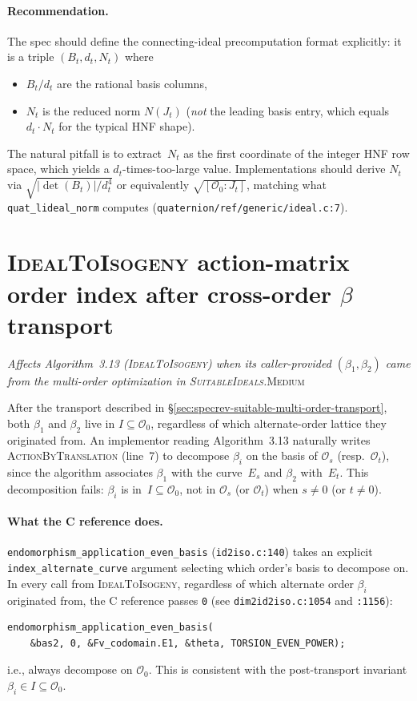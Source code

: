 \documentclass[a4paper,11pt]{article}
\newcommand{\algo}[1]{Algorithm~#1}
\newcommand{\medium}{\textsc{\color{RoyalBlue}Medium}}
\newcommand{\finding}[2]{\noindent\textit{#1}\hfill#2\par\smallskip}
\begin{document}
\paragraph{Recommendation.}
The spec should define the connecting-ideal precomputation
format explicitly: it is a triple $(B_t, d_t, N_t)$ where
\begin{itemize}
  \item $B_t / d_t$ are the rational basis columns,
  \item $N_t$ is the reduced norm $N(J_t)$ (\emph{not} the
    leading basis entry, which equals $d_t \cdot N_t$ for the
    typical HNF shape).
\end{itemize}
The natural pitfall is to extract~$N_t$ as the first
coordinate of the integer HNF row space, which yields a
$d_t$-times-too-large value.  Implementations should derive
$N_t$ via $\sqrt{|\det(B_t)| / d_t^4}$ or equivalently
$\sqrt{[\mathcal{O}_0 : J_t]}$, matching what
\texttt{quat\_lideal\_norm} computes
(\texttt{quaternion/ref/generic/ideal.c:7}).

\section{\textsc{IdealToIsogeny} action-matrix order index after
  cross-order $\beta$ transport}
\label{sec:specrev-action-matrix-index}

\finding{Affects \algo{3.13} (\textsc{IdealToIsogeny}) when its
  caller-provided $(\beta_1, \beta_2)$ came from the multi-order
  optimization in \textsc{SuitableIdeals}.}{\medium}

After the transport described in
\S\ref{sec:specrev-suitable-multi-order-transport}, both $\beta_1$
and $\beta_2$ live in $I \subseteq \mathcal{O}_0$, regardless of
which alternate-order lattice they originated from.  An
implementor reading \algo{3.13} naturally writes
\textsc{ActionByTranslation} (line~7) to decompose $\beta_i$ on
the basis of $\mathcal{O}_{s}$ (resp.\ $\mathcal{O}_{t}$), since
the algorithm associates $\beta_1$ with the curve~$E_s$ and
$\beta_2$ with~$E_t$.  This decomposition fails: $\beta_i$ is
in~$I \subseteq \mathcal{O}_0$, not in $\mathcal{O}_s$
(or $\mathcal{O}_t$) when $s \neq 0$ (or $t \neq 0$).

\paragraph{What the C reference does.}
\texttt{endomorphism\_application\_even\_basis}
(\texttt{id2iso.c:140}) takes an explicit
\texttt{index\_alternate\_curve} argument selecting which
order's basis to decompose on.  In every call from
\textsc{IdealToIsogeny}, regardless of which alternate order
$\beta_i$ originated from, the C reference passes \texttt{0}
(see \texttt{dim2id2iso.c:1054} and \texttt{:1156}):
\begin{verbatim}
endomorphism_application_even_basis(
    &bas2, 0, &Fv_codomain.E1, &theta, TORSION_EVEN_POWER);
\end{verbatim}
i.e., always decompose on $\mathcal{O}_0$.  This is consistent
with the post-transport invariant
$\beta_i \in I \subseteq \mathcal{O}_0$.
\end{document}
